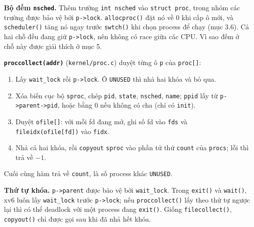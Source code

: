 \textbf{Bộ đếm \texttt{nsched}.} Thêm trường \texttt{int nsched} vào \texttt{struct proc}, trong nhóm các trường được bảo vệ bởi \texttt{p->lock}. \texttt{allocproc()} đặt nó về 0 khi cấp ô mới, và \texttt{scheduler()} tăng nó ngay trước \texttt{swtch()} khi chọn process để chạy (mục 3.6). Cả hai chỗ đều đang giữ \texttt{p->lock}, nên không có race giữa các CPU. Vì sao đếm ở chỗ này được giải thích ở mục 5.

\textbf{\texttt{proccollect(addr)}} (\texttt{kernel/proc.c}) duyệt từng ô \texttt{p} của \texttt{proc[]}:
\begin{enumerate}
    \item Lấy \texttt{wait\_lock} rồi \texttt{p->lock}. Ô \texttt{UNUSED} thì nhả hai khóa và bỏ qua.
    \item Xóa biến cục bộ \texttt{sproc}, chép \texttt{pid}, \texttt{state}, \texttt{nsched}, \texttt{name}; \texttt{ppid} lấy từ \texttt{p->parent->pid}, hoặc bằng 0 nếu không có cha (chỉ có \texttt{init}).
    \item Duyệt \texttt{ofile[]}: với mỗi fd đang mở, ghi số fd vào \texttt{fds} và \texttt{fileidx(ofile[fd])} vào \texttt{fidx}.
    \item Nhả cả hai khóa, rồi \texttt{copyout} \texttt{sproc} vào phần tử thứ \texttt{count} của \texttt{procs}; lỗi thì trả về $-1$.
\end{enumerate}
Cuối cùng hàm trả về \texttt{count}, là số process khác \texttt{UNUSED}.

\textbf{Thứ tự khóa.} \texttt{p->parent} được bảo vệ bởi \texttt{wait\_lock}. Trong \texttt{exit()} và \texttt{wait()}, xv6 luôn lấy \texttt{wait\_lock} trước \texttt{p->lock}; nếu \texttt{proccollect()} lấy theo thứ tự ngược lại thì có thể deadlock với một process đang \texttt{exit()}. Giống \texttt{filecollect()}, \texttt{copyout()} chỉ được gọi sau khi đã nhả hết khóa.
